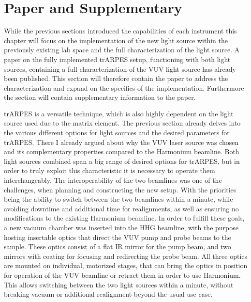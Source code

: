 \section{Paper and Supplementary}

While the previous sections introduced the capabilities of each instrument this chapter will focus on the implementation of the new light source within the previously existing lab space and the full characterization of the light source.
A paper on the fully implemented trARPES setup, functioning with both light sources, containing a full characterization of the VUV light source has already been published.
This section will therefore contain the paper to address the characterization and expand on the specifics of the implementation.
Furthermore the section will contain supplementary information to the paper.

trARPES is a versatile technique, which is also highly dependent on the light source used due to the matrix element.
The previous section already delves into the various different options for light sources and the desired parameters for trARPES.
There I already argued about why the VUV laser source was chosen and its complementary properties compared to the Harmonium beamline.
Both light sources combined span a big range of desired options for trARPES, but in order to truly exploit this characteristic it is necessary to operate them interchangeably. 
The interoperability of the two beamlines was one of the challenges, when planning and constructing the new setup.
With the priorities being the ability to switch between the two beamlines within a minute, while avoiding downtime and additional time for realignments, as well as ensuring no modifications to the existing Harmonium beamline.
In order to fulfill these goals, a new vacuum chamber was inserted into the HHG beamline, with the purpose hosting insertable optics that direct the VUV pump and probe beams to the sample.
These optics consist of a flat IR mirror for the pump beam, and two  mirrors with  coating for focusing and redirecting the probe beam.
All three optics are mounted on individual, motorized stages, that can bring the optics in position for operation of the VUV beamline or retract them in order to use Harmonium.
This allows switching between the two light sources within a minute, without breaking vacuum or additional realignment beyond the usual use case.


